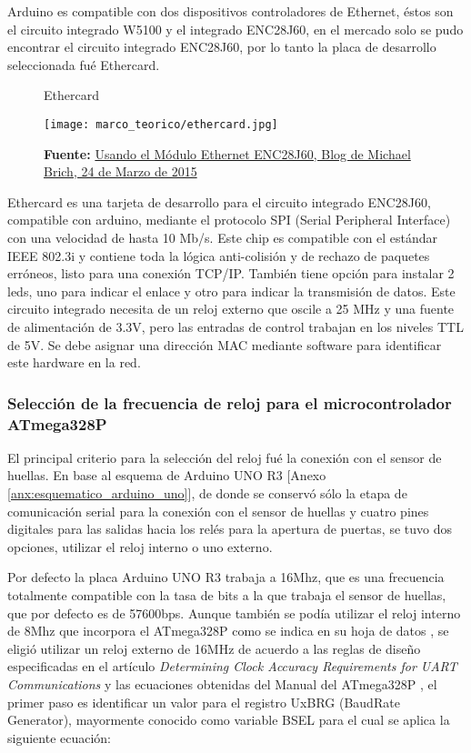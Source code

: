 \documentclass[../principal]{subfiles}
\begin{document}
  Arduino es compatible con dos dispositivos controladores de Ethernet, éstos son el circuito integrado W5100 y el integrado ENC28J60, en el mercado solo se pudo encontrar el circuito integrado ENC28J60, por lo tanto la placa de desarrollo seleccionada fué Ethercard.

  \begin{figure}[H]
    \centering
    \caption{Ethercard}
    \texttt{[image: marco\_teorico/ethercard.jpg]}
    \caption*{\textbf{Fuente:} \href{http://www.michaelbrich.com/using-the-enc28j60-ethernet-module-with-an-arduino-mega-2560/}{Usando el Módulo Ethernet ENC28J60, Blog de Michael Brich, 24 de Marzo de 2015}}
  \end{figure}

    Ethercard es una tarjeta de desarrollo para el circuito integrado ENC28J60, compatible con arduino, mediante el protocolo SPI (Serial Peripheral Interface) con una velocidad de hasta 10 Mb/s. Este chip es compatible con el estándar IEEE 802.3i y contiene toda la lógica anti-colisión y de rechazo de paquetes erróneos, listo para una conexión TCP/IP. También tiene opción para instalar 2 leds, uno para indicar el enlace y otro para indicar la transmisión de datos. Este circuito integrado necesita de un reloj externo que oscile a 25 MHz y una fuente de alimentación de 3.3V, pero las entradas de control trabajan en los niveles TTL de 5V. Se debe asignar una dirección MAC mediante software para identificar este hardware en la red.

  \subsubsection{Selección de la frecuencia de reloj para el microcontrolador ATmega328P}

  El principal criterio para la selección del reloj fué la conexión con el sensor de huellas. En base al esquema de Arduino UNO R3 [Anexo \ref{anx:esquematico_arduino_uno}], de donde se conservó sólo la etapa de comunicación serial para la conexión con el sensor de huellas y cuatro pines digitales para las salidas hacia los relés para la apertura de puertas, se tuvo dos opciones, utilizar el reloj interno o uno externo.

  Por defecto la placa Arduino UNO R3 trabaja a 16Mhz, que es una frecuencia totalmente compatible con la tasa de bits a la que trabaja el sensor de huellas, que por defecto es de 57600bps. Aunque también se podía utilizar el reloj interno de 8Mhz que incorpora el ATmega328P como se indica en su hoja de datos \cite{datasheet:atmega328}, se eligió utilizar un reloj externo de 16MHz de acuerdo a las reglas de diseño especificadas en el artículo \textit{Determining Clock Accuracy Requirements for UART Communications} \cite{reporte:determinando_precision_reloj_comunicacion_uart} y las ecuaciones obtenidas del Manual del ATmega328P \cite{datasheet:atmega328}, el primer paso es identificar un valor para el registro UxBRG (BaudRate Generator), mayormente conocido como variable BSEL para el cual se aplica la siguiente ecuación:
\end{document}
